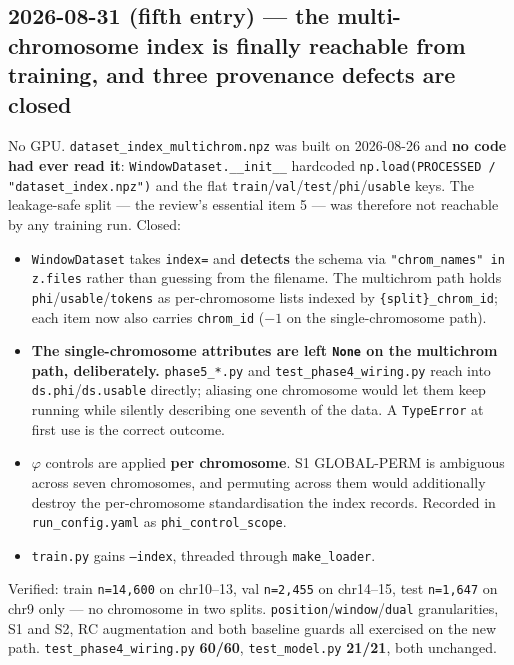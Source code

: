 \documentclass[11pt,a4paper]{article}
\newcommand{\code}[1]{\texttt{\small #1}}
\begin{document}
\subsection*{2026-08-31 (fifth entry) --- the multi-chromosome index is
finally reachable from training, and three provenance defects are closed}

No GPU. \code{dataset\_index\_multichrom.npz} was built on 2026-08-26 and
\textbf{no code had ever read it}: \code{WindowDataset.\_\_init\_\_} hardcoded
\code{np.load(PROCESSED / "dataset\_index.npz")} and the flat
\code{train}/\code{val}/\code{test}/\code{phi}/\code{usable} keys. The
leakage-safe split --- the review's essential item 5 --- was therefore not
reachable by any training run. Closed:

\begin{itemize}
\item \code{WindowDataset} takes \code{index=} and \textbf{detects} the schema
via \code{"chrom\_names" in z.files} rather than guessing from the filename.
The multichrom path holds \code{phi}/\code{usable}/\code{tokens} as
per-chromosome lists indexed by \code{\{split\}\_chrom\_id}; each item now also
carries \code{chrom\_id} ($-1$ on the single-chromosome path).
\item \textbf{The single-chromosome attributes are left \code{None} on the
multichrom path, deliberately.} \code{phase5\_*.py} and
\code{test\_phase4\_wiring.py} reach into \code{ds.phi}/\code{ds.usable}
directly; aliasing one chromosome would let them keep running while silently
describing one seventh of the data. A \code{TypeError} at first use is the
correct outcome.
\item $\varphi$ controls are applied \textbf{per chromosome}. S1
GLOBAL-PERM is ambiguous across seven chromosomes, and permuting across them
would additionally destroy the per-chromosome standardisation the index
records. Recorded in \code{run\_config.yaml} as \code{phi\_control\_scope}.
\item \code{train.py} gains \code{--index}, threaded through
\code{make\_loader}.
\end{itemize}

Verified: train \code{n=14{,}600} on chr10--13, val \code{n=2{,}455} on
chr14--15, test \code{n=1{,}647} on chr9 only --- no chromosome in two splits.
\code{position}/\code{window}/\code{dual} granularities, S1 and S2, RC
augmentation and both baseline guards all exercised on the new path.
\code{test\_phase4\_wiring.py} \textbf{60/60}, \code{test\_model.py}
\textbf{21/21}, both unchanged.
\end{document}
